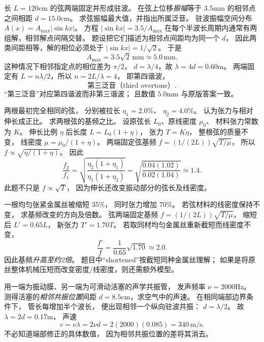 长 $L=120$cm 的弦两端固定并形成驻波。
在弦上位移\emph{振幅}等于
$3.5$mm 的相邻点之间相距
$d=15.0$cm。
求弦振幅最大值，并指出所属泛音。
\exsolution
驻波振幅空间分布
$A(x)=A_{\max}|\sin kx|$。
方程 $|\sin kx|=3.5/A_{\max}$
在每个半波长周期内通常有两组解，相邻解点间隔交替。
题设把它们描述为相邻点间距均为同一个 $d$，
因此两类间距相等，解的相位必须处于
$|\sin kx|=1/\sqrt2$。
于是
\[
\boxed{A_{\max}=3.5\sqrt2\,\mathrm{mm}
\simeq5.0\,\mathrm{mm}}.
\]
这种情况下相邻指定点的相位差为 $\pi/2$，
$d=\lambda/4$，故 $\lambda=4d=0.60$m。
两端固定有
$L=n\lambda/2$，所以
$n=2L/\lambda=4$，
即第四谐波，
\[
\boxed{\text{第三泛音（third overtone）}}.
\]
\excheck “第三泛音”对应第四谐波而非第三谐波；
且数值 $5.0$mm 与原版答案一致。

两根最初完全相同的弦，
分别被拉长
$\eta_1=2.0\%$、
$\eta_2=4.0\%$。
认为张力与相对伸长成正比。
求两根弦的基频之比。
\exsolution
设原弦长 $L_0$、原线密度 $\mu_0$、
材料张力常数为 $K$。
伸长比例 $\eta$ 后长度
$L=L_0(1+\eta)$，
张力 $T=K\eta$，
整根弦的质量不变，
线密度 $\mu=\mu_0/(1+\eta)$。
两端固定弦基频
$f=(1/(2L))\sqrt{T/\mu}$，
所以
$f\propto\sqrt{\eta/(1+\eta)}$。
因此
\[
\boxed{\frac{f_2}{f_1}
=\sqrt{\frac{\eta_2(1+\eta_1)}
{\eta_1(1+\eta_2)}}}
=\sqrt{\frac{0.04(1.02)}{0.02(1.04)}}
\simeq1.4.
\]
\excheck 此题不只是 $f\propto\sqrt T$，
因为伸长还改变振动部分的弦长及线密度。

一根均匀张紧金属丝被缩短 $35\%$，
同时张力增加 $70\%$。
若弦材料的线密度保持不变，
求基频改变的方向及倍数。
\exsolution
弦两端固定基频
$f=(1/(2L))\sqrt{T/\mu}$，
缩短后
$L'=0.65L$，
新张力
$T'=1.70T$。
若取同材均匀金属丝重新截短而线密度不变，
\[
\boxed{\frac{f'}f=\frac1{0.65}\sqrt{1.70}
\simeq2.0}.
\]
因此基频\emph{升高至约2倍}。
\excheck 题目中“shortened”按截短同种金属丝理解；
如果是将原丝整体机械压短而改变密度/线密度，则还需额外模型。

用一端为振动膜、另一端为可滑动活塞的声学共振管，
发声频率 $\nu=2000$Hz。
测得活塞的\emph{相邻共振位置}间距
$d=8.5$cm，求空气中的声速。
\exsolution
在相同端部边界条件下，
管长每增加半个波长，
便出现相邻一个纵向驻波共振：
$d=\lambda/2$。
故
$\lambda=2d=0.17$m，
声速
\[
\boxed{v=\nu\lambda=2\nu d
=2(2000)(0.085)
=340\,\mathrm{m/s}}.
\]
\excheck 不必知道端部修正的具体数值，
因为相邻共振位置的差将其消去。


